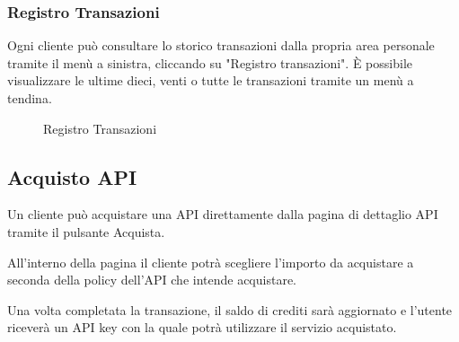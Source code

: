\subsubsection{Registro Transazioni}
Ogni cliente può consultare lo storico transazioni dalla propria area personale tramite il menù a sinistra, cliccando su "Registro transazioni". \MakeUppercase{è} possibile visualizzare le ultime dieci, venti o tutte le transazioni tramite un menù a tendina.

\label{Registro Transazioni }
\begin{figure}[H]
	\centering
	\caption{Registro Transazioni}
\end{figure}

\subsection{Acquisto API}
Un cliente può acquistare una API direttamente dalla pagina di dettaglio API tramite il pulsante Acquista. 

All'interno della pagina il cliente potrà scegliere l'importo da acquistare a seconda della policy dell'API che intende acquistare.  

Una volta completata la transazione, il saldo di crediti sarà aggiornato e l'utente riceverà un API key con la quale potrà utilizzare il servizio acquistato. 

